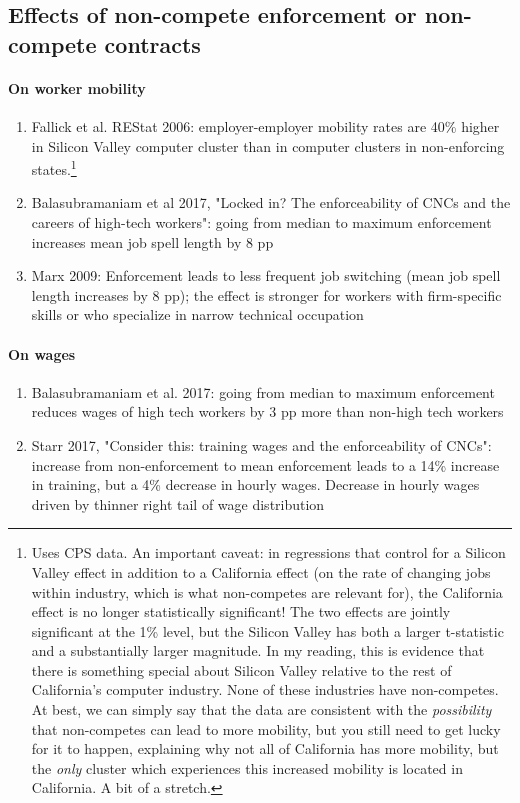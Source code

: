 \documentclass[12pt,english]{article}
\theoremstyle{remark}
\begin{document}
\subsection{Effects of non-compete enforcement or non-compete contracts}
\paragraph{On worker mobility}
\begin{enumerate}
	\item Fallick et al. REStat 2006: employer-employer mobility rates are 40\% higher in Silicon Valley computer cluster than in computer clusters in non-enforcing states.\footnote{Uses CPS data. An important caveat: in regressions that control for a Silicon Valley effect in addition to a California effect (on the rate of changing jobs within industry, which is what non-competes are relevant for), the California effect is no longer statistically significant! The two effects are jointly significant at the 1\% level, but the Silicon Valley has both a larger t-statistic and a substantially larger magnitude. In my reading, this is evidence that there is something special about Silicon Valley relative to the rest of California's computer industry. None of these industries have non-competes. At best, we can simply say that the data are consistent with the \textit{possibility} that non-competes can lead to more mobility, but you still need to get lucky for it to happen, explaining why not all of California has more mobility, but the \textit{only} cluster which experiences this increased mobility is located in California. A bit of a stretch.}
	\item Balasubramaniam et al 2017, "Locked in? The enforceability of CNCs and the careers of high-tech workers": going from median to maximum enforcement increases mean job spell length by 8 pp
	\item Marx 2009: Enforcement leads to less frequent job switching (mean job spell length increases by 8 pp); the effect is stronger for workers with firm-specific skills or who specialize in narrow technical occupation  
\end{enumerate}

\paragraph{On wages}
\begin{enumerate}
	\item Balasubramaniam et al. 2017: going from median to maximum enforcement reduces wages of high tech workers by 3 pp more than non-high tech workers
	\item Starr 2017, "Consider this: training wages and the enforceability of CNCs": increase from non-enforcement to mean enforcement leads to a 14\% increase in training, but a 4\% decrease in hourly wages. Decrease in hourly wages driven by thinner right tail of wage distribution
\end{enumerate}
\end{document}
